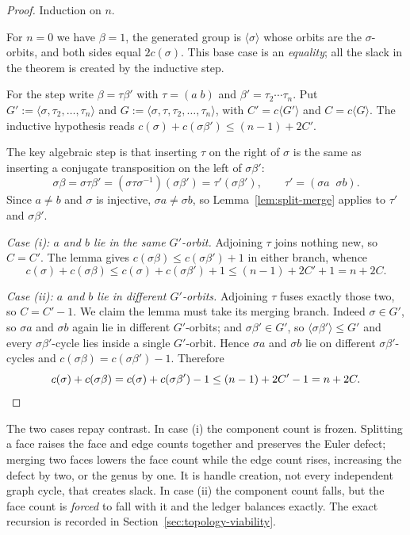 \begin{proof}
Induction on $n$.

For $n = 0$ we have $\beta = 1$, the generated group is $\langle\sigma\rangle$
whose orbits are the $\sigma$-orbits, and both sides equal $2c(\sigma)$.
This base case is an \emph{equality}; all the slack in the theorem is
created by the inductive step.

For the step write $\beta = \tau\beta'$ with $\tau = (a\;b)$ and
$\beta' = \tau_2\cdots\tau_n$. Put
$G' := \langle \sigma, \tau_2, \dots, \tau_n\rangle$ and
$G := \langle \sigma, \tau, \tau_2, \dots, \tau_n\rangle$, with
$C' = c\langle G'\rangle$ and $C = c\langle G\rangle$. The inductive
hypothesis reads $c(\sigma) + c(\sigma\beta') \le (n-1) + 2C'$.

The key algebraic step is that inserting $\tau$ on the right of $\sigma$ is
the same as inserting a conjugate transposition on the left of
$\sigma\beta'$:
\[
  \sigma\beta = \sigma\tau\beta'
  = (\sigma\tau\sigma^{-1})(\sigma\beta')
  = \tau'(\sigma\beta'), \qquad \tau' = (\sigma a\;\;\sigma b) .
\]
Since $a \neq b$ and $\sigma$ is injective, $\sigma a \neq \sigma b$, so
Lemma~\ref{lem:split-merge} applies to $\tau'$ and $\sigma\beta'$.

\emph{Case (i): $a$ and $b$ lie in the same $G'$-orbit.} Adjoining $\tau$
joins nothing new, so $C = C'$. The lemma gives
$c(\sigma\beta) \le c(\sigma\beta') + 1$ in either branch, whence
\[
  c(\sigma) + c(\sigma\beta) \le c(\sigma) + c(\sigma\beta') + 1
  \le (n-1) + 2C' + 1 = n + 2C .
\]

\emph{Case (ii): $a$ and $b$ lie in different $G'$-orbits.} Adjoining
$\tau$ fuses exactly those two, so $C = C' - 1$. We claim the lemma must
take its merging branch. Indeed $\sigma \in G'$, so $\sigma a$ and
$\sigma b$ again lie in different $G'$-orbits; and $\sigma\beta' \in G'$,
so $\langle \sigma\beta'\rangle \le G'$ and every $\sigma\beta'$-cycle lies
inside a single $G'$-orbit. Hence $\sigma a$ and $\sigma b$ lie on
different $\sigma\beta'$-cycles and
$c(\sigma\beta) = c(\sigma\beta') - 1$. Therefore
\[
  c(\sigma) + c(\sigma\beta) = c(\sigma) + c(\sigma\beta') - 1
  \le (n-1) + 2C' - 1 = n + 2C . \qedhere
\]
\end{proof}

The two cases repay contrast. In case (i) the component count is frozen.
Splitting a face raises the face and edge counts together and preserves
the Euler defect; merging two faces lowers the face count while the edge
count rises, increasing the defect by two, or the genus by one. It is
handle creation, not every independent graph cycle, that creates slack.
In case (ii) the component count falls, but the face count is \emph{forced}
to fall with it and the ledger balances exactly. The exact recursion is
recorded in Section~\ref{sec:topology-viability}.

